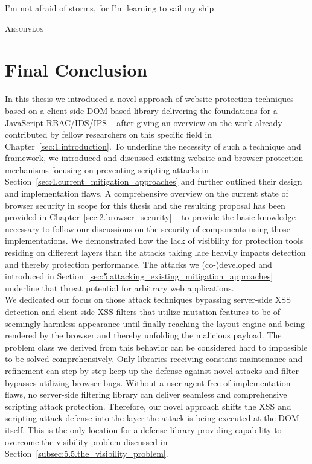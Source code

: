 \epigraph{I'm not afraid of storms, for I'm learning to sail my ship}%
{\textsc{Aeschylus}}

\section{Final Conclusion}
\label{sec:final_conclusion}

In this thesis we introduced a novel approach of website protection techniques based on a client-side DOM-based library delivering the foundations for a JavaScript RBAC/IDS/IPS -- after giving an overview on the work already contributed by fellow researchers on this specific field in Chapter~\ref{sec:1.introduction}. To underline the necessity of such a technique and framework, we introduced and discussed existing website and browser protection mechanisms focusing on preventing scripting attacks in Section~\ref{sec:4.current_mitigation_approaches} and further outlined their design and implementation flaws. A comprehensive overview on the current state of browser security in scope for this thesis and the resulting proposal has been provided in Chapter~\ref{sec:2.browser_security} -- to provide the basic knowledge necessary to follow our discussions on the security of components using those implementations. We demonstrated how the lack of visibility for protection tools residing on different layers than the attacks taking lace heavily impacts detection and thereby protection performance. The attacks we (co-)developed and introduced in Section~\ref{sec:5.attacking_existing_mitigation_approaches} underline that threat potential for arbitrary web applications.\\

We dedicated our focus on those attack techniques bypassing server-side XSS detection and client-side XSS filters that utilize mutation features to be of seemingly harmless appearance until finally reaching the layout engine and being rendered by the browser and thereby unfolding the malicious payload. The problem class we derived from this behavior can be considered hard to impossible to be solved comprehensively. Only libraries receiving constant maintenance and refinement can step by step keep up the defense against novel attacks and filter bypasses utilizing browser bugs. Without a user agent free of implementation flaws, no server-side filtering library can deliver seamless and comprehensive scripting attack protection. Therefore, our novel approach shifts the XSS and scripting attack defense into the layer the attack is being executed at the DOM itself. This is the only location for a defense library providing capability to overcome the visibility problem discussed in Section~\ref{subsec:5.5.the_visibility_problem}. \\

